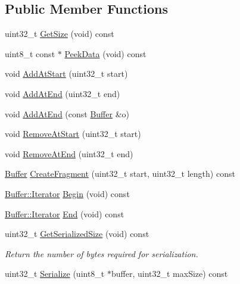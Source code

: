 \subsection*{Public Member Functions}
\begin{DoxyCompactItemize}
\item 
uint32\+\_\+t \hyperlink{classns3_1_1Buffer_a3047b8f2dad303c6370695122f1884f0}{Get\+Size} (void) const 
\item 
uint8\+\_\+t const $\ast$ \hyperlink{classns3_1_1Buffer_a07800b41f95ec9c5bfdfae624b9351b0}{Peek\+Data} (void) const 
\item 
void \hyperlink{classns3_1_1Buffer_a8abd8164c3671d3dadc98fc66fade7b1}{Add\+At\+Start} (uint32\+\_\+t start)
\item 
void \hyperlink{classns3_1_1Buffer_a92dd87809af24fb10696fee9a9cb56cf}{Add\+At\+End} (uint32\+\_\+t end)
\item 
void \hyperlink{classns3_1_1Buffer_a60211196881cfccb64f67d71449eda83}{Add\+At\+End} (const \hyperlink{classns3_1_1Buffer}{Buffer} \&o)
\item 
void \hyperlink{classns3_1_1Buffer_adeecbb3e8f518aec6fee0437578ade4b}{Remove\+At\+Start} (uint32\+\_\+t start)
\item 
void \hyperlink{classns3_1_1Buffer_a83b30fd8e1202e778fb471757b800d47}{Remove\+At\+End} (uint32\+\_\+t end)
\item 
\hyperlink{classns3_1_1Buffer}{Buffer} \hyperlink{classns3_1_1Buffer_a9285016f38b451c65edb50196ef817f8}{Create\+Fragment} (uint32\+\_\+t start, uint32\+\_\+t length) const 
\item 
\hyperlink{classns3_1_1Buffer_1_1Iterator}{Buffer\+::\+Iterator} \hyperlink{classns3_1_1Buffer_a893d4bf50df13e730b6cd0fda91b967f}{Begin} (void) const 
\item 
\hyperlink{classns3_1_1Buffer_1_1Iterator}{Buffer\+::\+Iterator} \hyperlink{classns3_1_1Buffer_a52207c7aed7bae89fba2f9e997c82724}{End} (void) const 
\item 
uint32\+\_\+t \hyperlink{classns3_1_1Buffer_a0d38b182a66558a719a17ab749643c21}{Get\+Serialized\+Size} (void) const 
\begin{DoxyCompactList}\small\item\em Return the number of bytes required for serialization. \end{DoxyCompactList}\item 
uint32\+\_\+t \hyperlink{classns3_1_1Buffer_af32e7e0a4e53c5a7e3b4e921ccb07aa8}{Serialize} (uint8\+\_\+t $\ast$buffer, uint32\+\_\+t max\+Size) const 
\item 

\end{DoxyCompactItemize}
